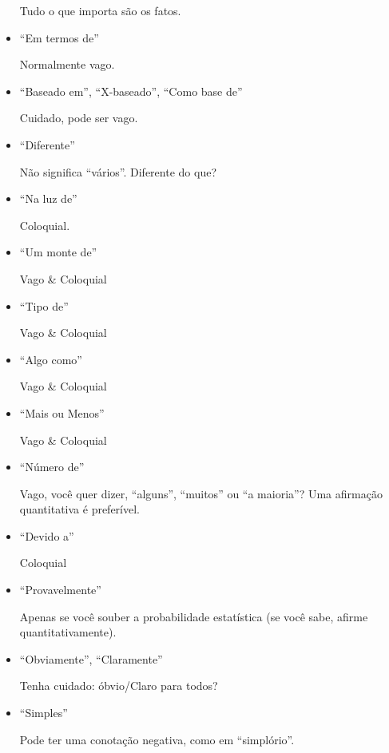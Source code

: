 \begin{itemize}
		\indent Tudo o que importa s\~{a}o os fatos.
		
	\item ``Em termos de''

		\indent Normalmente vago.
		
	\item ``Baseado em'', ``X-baseado'', ``Como base de''

		\indent Cuidado, pode ser vago.
		
	\item ``Diferente''

		\indent	N\~{a}o significa ``v\'{a}rios''. Diferente do que?
		
	\item ``Na luz de''

		\indent	Coloquial. 
		
	\item ``Um monte de''

		\indent	Vago \& Coloquial
		
	\item ``Tipo de''

		\indent	Vago \& Coloquial
		
	\item ``Algo como''

		\indent	Vago \& Coloquial
		
	\item ``Mais ou Menos'' 

		\indent	Vago \& Coloquial
		
	\item ``N\'{u}mero de''

		\indent	Vago, você quer dizer, ``alguns'', ``muitos'' ou ``a maioria''? Uma afirma\c{c}\~{a}o quantitativa \'{e} prefer\'{i}vel.
		
	\item ``Devido a''

		\indent	Coloquial
		
	\item ``Provavelmente''

		\indent	Apenas se você souber a probabilidade estat\'{i}stica (se você sabe, afirme quantitativamente).
		
	\item ``Obviamente'', ``Claramente''

		\indent Tenha cuidado: \'{o}bvio/Claro para todos?
		
	\item ``Simples''

		\indent Pode ter uma conota\c{c}\~{a}o negativa, como em ``simpl\'{o}rio''.
		

\end{itemize}
